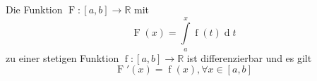 Die Funktion $\operatorname{F} : [a,b] \to \mathbb{R}$ mit
$$\operatorname{F}(x) = \int\limits_{a}^x \operatorname{f}(t) \operatorname{d}t$$ 
zu einer stetigen Funktion $\operatorname{f} : [a, b] \to \mathbb{R}$ ist differenzierbar und es gilt
$$\operatorname{F}'(x) = \operatorname{f}(x), \forall x \in [a,b]$$ 

